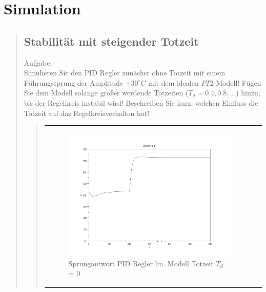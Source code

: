 \section{Simulation}
\begin{quote}
    
    
    
    \subsection{Stabilität mit steigender Totzeit}
    \begin{quote}
        
    \end{quote}
    Aufgabe:\\
    Simulieren Sie den PID Regler zunächst ohne Totzeit mit einem Führungssprung der Amplitude $+30^{\circ}C$ mit dem
    idealen $PT2$-Modell! Fügen Sie dem Modell solange größer werdende Totzeiten ($T_d = 0.4, 0.8, . . .$) hinzu, bis
    der Regelkreis instabil wird! Beschreiben Sie kurz, welchen Einfluss die Totzeit auf das Regelkreisverhalten
    hat!\vspace{1em}
    
    
    
    \begin{quote}
            \begin{center}
            
                \begin{tabular}{ll}
                \hspace{-2.5cm}
                    \begin{minipage}{0.6\textwidth}
                        \begin{figure}[H]
                            \includegraphics[scale=0.4, trim = 0cm 0cm 0cm
                            0cm, clip]
                            {./Bilder/4_1_Td_0}
                              \caption{Sprungantwort PID Regler lin. Modell Totzeit $T_d$ = 0}
                        \end{figure}
                    \end{minipage}
                    

\end{tabular}
\end{center}
\end{quote}
\end{quote}
